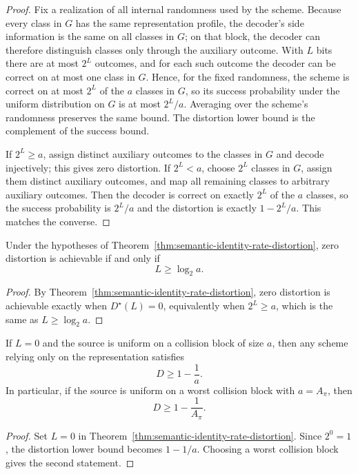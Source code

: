 \begin{proof}
Fix a realization of all internal randomness used by the scheme. Because every class in $G$ has the same representation profile, the decoder's side information is the same on all classes in $G$; on that block, the decoder can therefore distinguish classes only through the auxiliary outcome. With $L$ bits there are at most $2^L$ outcomes, and for each such outcome the decoder can be correct on at most one class in $G$. Hence, for the fixed randomness, the scheme is correct on at most $2^L$ of the $a$ classes in $G$, so its success probability under the uniform distribution on $G$ is at most $2^L/a$. Averaging over the scheme's randomness preserves the same bound. The distortion lower bound is the complement of the success bound.

If $2^L \ge a$, assign distinct auxiliary outcomes to the classes in $G$ and decode injectively; this gives zero distortion. If $2^L < a$, choose $2^L$ classes in $G$, assign them distinct auxiliary outcomes, and map all remaining classes to arbitrary auxiliary outcomes. Then the decoder is correct on exactly $2^L$ of the $a$ classes, so the success probability is $2^L/a$ and the distortion is exactly $1-2^L/a$. This matches the converse.
\end{proof}

\begin{corollary}\label{cor:zero-error-threshold-distortion}
Under the hypotheses of Theorem~\ref{thm:semantic-identity-rate-distortion}, zero distortion is achievable if and only if
\[
L \ge \log_2 a.
\]
\end{corollary}

\begin{proof}
By Theorem~\ref{thm:semantic-identity-rate-distortion}, zero distortion is achievable exactly when $D^\star(L)=0$, equivalently when $2^L \ge a$, which is the same as $L \ge \log_2 a$.
\end{proof}

\begin{corollary}\label{cor:zero-budget-error-floor}
If $L=0$ and the source is uniform on a collision block of size $a$, then any scheme relying only on the representation satisfies
\[
D \ge 1 - \frac{1}{a}.
\]
In particular, if the source is uniform on a worst collision block with $a=A_\pi$, then
\[
D \ge 1 - \frac{1}{A_\pi}.
\]
\end{corollary}

\begin{proof}
Set $L=0$ in Theorem~\ref{thm:semantic-identity-rate-distortion}. Since $2^0=1$, the distortion lower bound becomes $1-1/a$. Choosing a worst collision block gives the second statement.
\end{proof}

